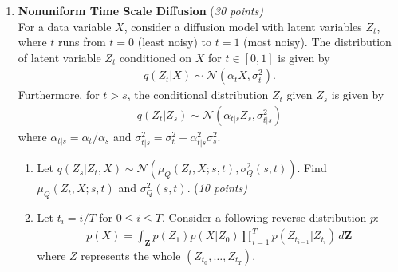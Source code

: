 \documentclass[12pt]{article}
\begin{document}
\begin{enumerate}

\item {\bf Nonuniform Time Scale Diffusion} {(\it 30 points)}\\
For a data variable $X$, consider a diffusion model with latent variables $Z_t$,
where $t$ runs from $t=0$ (least noisy) to $t=1$ (most noisy).
The distribution of latent variable $Z_t$ conditioned on $X$ for $t\in[0, 1]$ is given by
\begin{align*}
    q(Z_t|X)\sim \mathcal{N}(\alpha_t X, \sigma_t^2).
\end{align*}
Furthermore, for $t>s$, the conditional distribution $Z_t$ given $Z_s$ is given by
\begin{align*}
    q(Z_t|Z_s) \sim \mathcal{N}(\alpha_{t|s} Z_s, \sigma_{t|s}^2)
\end{align*}
where $\alpha_{t|s} = \alpha_t/\alpha_s$ and $\sigma_{t|s}^2 = \sigma_t^2 - \alpha_{t|s}^2\sigma_s^2$.
\begin{enumerate}
\item Let $q(Z_s|Z_t, X) \sim \mathcal{N}(\mu_Q(Z_t, X;s, t), \sigma_Q^2(s, t))$.
Find $\mu_Q(Z_t, X;s, t)$ and $\sigma_Q^2(s, t)$.  {(\it 10 points)}
\item Let $t_i = i/T$ for $0\leq i\leq T$.
Consider a following reverse distribution $p$:
\begin{align*}
    p(X) = \int_{\mathbf{Z}} p(Z_1) p(X|Z_0) \prod_{i=1}^T p(Z_{t_{i-1}}|Z_{t_i})\, d\mathbf{Z}
\end{align*}
where $Z$ represents the whole $(Z_{t_0}, \dots, Z_{t_T})$.


\end{enumerate}
\end{enumerate}
\end{document}
